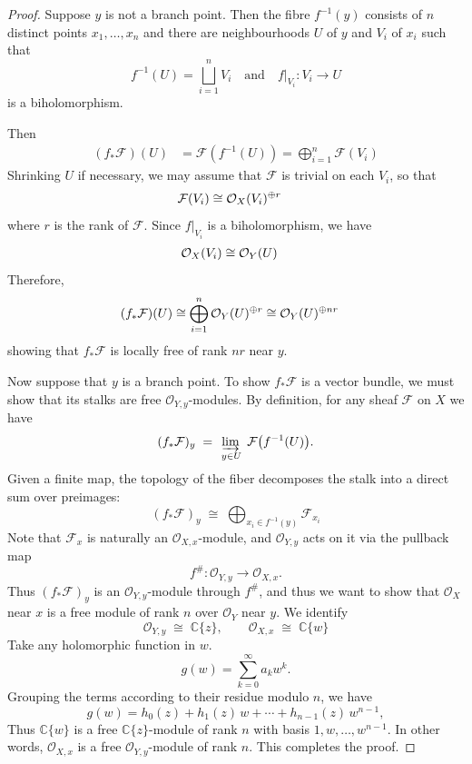 \documentclass[12pt]{article}
\begin{document}
\begin{proof}
Suppose $y$ is not a branch point.  
Then the fibre $f^{-1}(y)$ consists of $n$ distinct points $x_1,\dots,x_n$ and there are neighbourhoods $U$ of $y$ and $V_i$ of $x_i$ such that
\[f^{-1}(U) = \bigsqcup_{i=1}^n V_i \quad\text{and}\quad f|_{V_i} : V_i \to U\] is a biholomorphism.  

Then \begin{align*}
(f_*\mathcal{F})(U) & = \mathcal{F}(f^{-1}(U)) = \bigoplus_{i=1}^n \mathcal{F}(V_i)
\end{align*}
Shrinking $U$ if necessary, we may assume that $\mathcal{F}$ is trivial on each $V_i$, so that \begin{align*}
    \mathcal{F}(V_i) & \cong {\mathcal{O}}_X(V_i)^{\oplus r}
\end{align*} where $r$ is the rank of $\mathcal{F}$. Since $f|_{V_i}$ is a biholomorphism, we have \begin{align*}
    {\mathcal{O}}_X(V_i) & \cong {\mathcal{O}}_Y(U)
\end{align*} Therefore, \begin{align*}
    (f_*\mathcal{F})(U) & \cong \bigoplus_{i=1}^n {\mathcal{O}}_Y(U)^{\oplus r} \cong {\mathcal{O}}_Y(U)^{\oplus nr}
\end{align*} showing that $f_*\mathcal{F}$ is locally free of rank $nr$ near $y$.

Now suppose that $y$ is a branch point. To show $f_*\mathcal{F}$ is a vector bundle, we must show that its stalks are free $\mathcal O_{Y,y}$-modules. By definition, for any sheaf $\mathcal F$ on $X$ we have
\[
    (f_*\mathcal F)_y \;=\; \varinjlim_{\,y\in U}\; \mathcal F\bigl(f^{-1}(U)\bigr).
\]
Given a finite map, the topology of the fiber decomposes the stalk into a direct sum over preimages:
\[(f_*\mathcal F)_y \;\cong\; \bigoplus_{x_i\in f^{-1}(y)} \mathcal F_{x_i}\]
Note that $\mathcal F_x$ is naturally an $\mathcal O_{X,x}$-module, and $\mathcal O_{Y,y}$ acts on it via the pullback map
\[
    f^\#:\mathcal O_{Y,y}\longrightarrow \mathcal O_{X,x}.
\]
Thus $(f_*\mathcal F)_y$ is an $\mathcal O_{Y,y}$-module through $f^\#$, and thus we want to show that $\mathcal O_X$ near $x$ is a free module of rank $n$ over $\mathcal O_Y$ near $y$. We identify
\[\mathcal O_{Y,y} \;\cong\; \mathbb C\{z\}, \qquad
\mathcal O_{X,x} \;\cong\; \mathbb C\{w\}\] 
Take any holomorphic function in $w$.
\[
g(w)=\sum_{k=0}^\infty a_k w^k.
\]
Grouping the terms according to their residue modulo $n$, we have
\[
g(w)=h_0(z)+h_1(z)\,w+\cdots+h_{n-1}(z)\,w^{n-1},
\]
Thus $\mathbb{C}\{w\}$ is a free $\mathbb{C}\{z\}$-module of rank $n$ with basis $1,w,\dots,w^{n-1}$. In other words, $\mathcal O_{X,x}$ is a free $\mathcal O_{Y,y}$-module of rank $n$. This completes the proof.
\end{proof}
\end{document}
